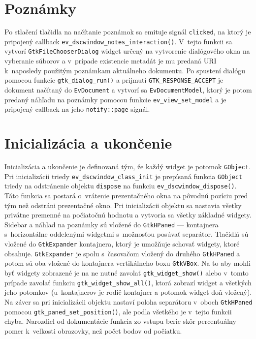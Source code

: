 \documentclass[12pt,oneside,final]{fithesis2}
\begin{document}
\section{Poznámky}
Po stlačení tlačidla na načítanie poznámok sa emituje signál \texttt{clicked}, na ktorý je pripojený callback \texttt{ev\_\-dscwindow\_\-notes\_\-interaction()}. V~tejto funkcii sa vytvorí \texttt{GtkFileChooserDialog} widget určený na vytvorenie dialógového okna na vyberanie súborov a v~prípade existencie metadát je mu predaná URI k~naposledy použitým poznámkam aktuálneho dokumentu. Po spustení dialógu pomocou funkcie \texttt{gtk\_\-dialog\_\-run()} a prijmutí \texttt{GTK\_\-RESPONSE\_\-ACCEPT} je dokument načítaný do \texttt{EvDocument} a vytvorí sa \texttt{EvDocumentModel}, ktorý je potom predaný náhľadu na poznámky pomocou funkcie \texttt{ev\_\-view\_\-set\_\-model} a je pripojený callback na jeho \texttt{notify::page} signál.
\section{Inicializácia a ukončenie}
Inicializácia a ukončenie je definovaná tým, že každý widget je potomok \texttt{GObject}. Pri inicializácii triedy \texttt{ev\_\-dscwindow\_\-class\_\-init} je prepísaná funkcia \texttt{GObject} triedy na odstránenie objektu \texttt{dispose} na funkciu \texttt{ev\_\-dscwindow\_\-dispose()}. Táto funkcia sa postará o~vrátenie prezentačného okna na pôvodnú pozíciu pred tým než odstráni prezentačné okno. Pri inicializácii objektu sa nastavia všetky privátne premenné na počiatočnú hodnotu a vytvoria sa všetky základné widgety. Sidebar a náhľad na poznámky sú vložené do \texttt{GtkHPaned} --- kontajnera s~horizontálne oddelenými widgetmi s~možnosťou posúvať separátor. Tlačidlá sú vložené do \texttt{GtkExpander} kontajnera, ktorý je umožňuje schovať widgety, ktoré obsahuje. \texttt{GtkExpander} je spolu s~časovačom vložený do druhého \texttt{GtkHPaned} a potom sú oba vložené do kontajnera vertikálneho boxu \texttt{GtkVBox}. Na to aby mohli byť widgety zobrazené je na ne nutné zavolať \texttt{gtk\_\-widget\_\-show()} alebo v~tomto prípade zavolať funkciu \texttt{gtk\_\-widget\_\-show\_\-all()}, ktorá zobrazí widget a všetkých jeho potomkov (u~kontajnerov je rodič kontajner a potomok widget doň vložený). Na záver sa pri inicializácii objektu nastaví poloha separátoru v~oboch \texttt{GtkHPaned} pomocou \texttt{gtk\_\-paned\_\-set\_\-position()}, ale podla všetkého je v~tejto funkcii chyba. Narozdiel od dokumentácie funkcia zo vstupu berie skôr percentuálny pomer k~veľkosti obrazovky, než počet bodov od počiatku.
\end{document}
